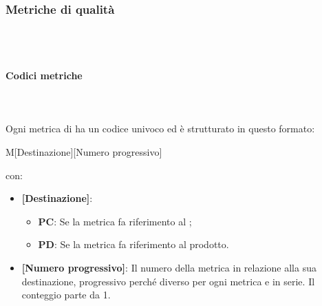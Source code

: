 \subsubsection{Metriche di qualità}\mbox{}\\ \\
\paragraph{Codici metriche}\mbox{}\\ \\
Ogni metrica di  ha un codice univoco ed è strutturato in questo formato:
\begin{center}
    M[Destinazione][Numero progressivo]
\end{center}
con:
\begin{itemize}  
    \item \textbf{[Destinazione]}:
    \begin{itemize}
        \item \textbf{PC}: Se la metrica fa riferimento al ;
        \item \textbf{PD}: Se la metrica fa riferimento al prodotto.
    \end{itemize}
    \item \textbf{[Numero progressivo]}: Il numero della metrica in relazione alla sua destinazione, progressivo perché diverso per ogni metrica e in serie. Il conteggio parte da 1.
\end{itemize}

